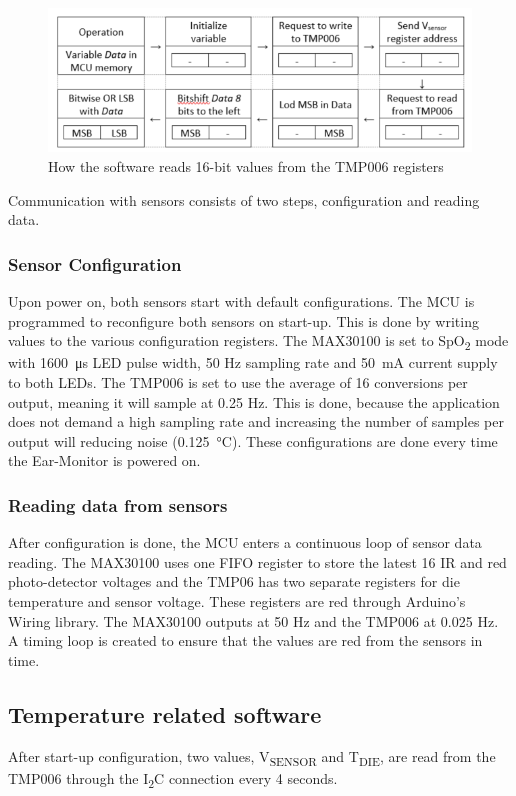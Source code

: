 \begin{figure}[H]
   \centering
   \includegraphics[scale=1]{figs/I2C_Read.png}
   \caption{How the software reads 16-bit values from the TMP006 registers}
   \label{fig:I2C_Read}
\end{figure}

Communication with sensors consists of two steps, configuration and reading data.

\subsubsection{Sensor Configuration}
Upon power on, both sensors start with default configurations. The MCU is programmed to reconfigure both sensors on start-up. This is done by writing values to the various configuration registers.
The MAX30100 is set to SpO\textsubscript{2} mode with \SI{1600}{\micro\second} LED pulse width, 50 Hz sampling rate and \SI{50}{\milli\ampere} current supply to both LEDs. The TMP006 is set to use the average of 16 conversions per output, meaning it will sample at 0.25 Hz. This is done, because the application does not demand a high sampling rate and increasing the number of samples per output will reducing noise (\SI{0.125}{\celsius}). These configurations are done every time the Ear-Monitor is powered on.

\subsubsection{Reading data from sensors}
After configuration is done, the MCU enters a continuous loop of sensor data reading. The MAX30100 uses one FIFO register to store the latest 16 IR and red photo-detector voltages and the TMP06 has two separate registers for die temperature and sensor voltage. These registers are red through Arduino's Wiring library. The MAX30100 outputs at 50 Hz and the TMP006 at 0.025 Hz. A timing loop is created to ensure that the values are red from the sensors in time.

\subsection{Temperature related software}
\label{sec:Temperature related software}
After start-up configuration, two values, V\textsubscript{SENSOR} and T\textsubscript{DIE}, are read from the TMP006 through the I\textsubscript{2}C connection every 4 seconds.


